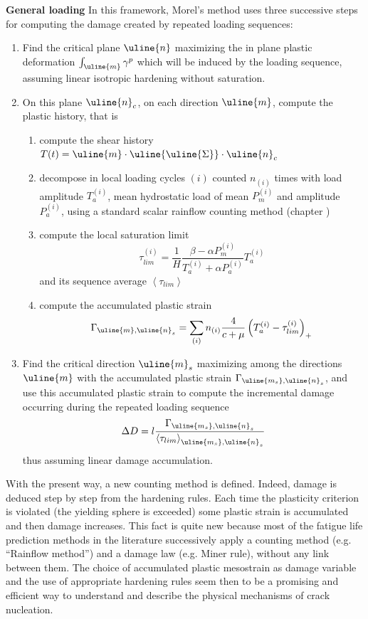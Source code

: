 \textbf{General loading}
 In this framework, Morel's method uses three successive steps for computing the damage created by repeated loading sequences:

\begin{enumerate}
\item Find the critical plane $\uline{n}$ maximizing the in plane plastic deformation $\int_{\uline{m}}\gamma^p$ which will be induced by the loading sequence, assuming linear isotropic hardening without saturation.
\item On this plane  $\uline{n}_c$, on each direction $\uline{m}$, compute the plastic history, that is
\begin{enumerate}
	\item compute the shear history $T(t)=\uline{m}\cdot \uline{\uline{\Sigma}}\cdot \uline{n}_c$
	\item decompose in local loading cycles $(i)$ counted $n_{(i)}$ times with load amplitude $T_a^{(i)}$, mean hydrostatic load of mean $P_m^{(i)}$ and amplitude $P_a^{(i)}$, using a standard scalar rainflow counting method (chapter \cite{chp:4})
	\item compute the local saturation limit $$\tau_{lim}^{(i)}=\frac{1}{H}\frac{\beta-\alpha P_m^{(i)}}{T_a^{(i)}+\alpha P_a^{(i)}}T_a^{(i)}$$ and its sequence average $\left\langle \tau_{lim} \right\rangle$ 
	\item compute the accumulated plastic strain 
	\begin{equation}
\Gamma_{\uline{m},\uline{n}_s}=\sum_{(i)}n_{(i)}\dfrac{4}{c+\mu}\left(T_a^{(i)}-\tau_{lim}^{(i)} \right)_+
\label{eq.morel_plastic}
	\end{equation}
\end{enumerate}
\item Find the critical direction $\uline{m}_s$ maximizing among the directions $\uline{m}$ with the accumulated plastic strain $\Gamma_{\uline{m_s},\uline{n}_s}$, and use this accumulated plastic strain to compute the incremental damage occurring during the repeated loading sequence
\begin{equation}\Delta D=l\dfrac{\Gamma_{\uline{m_s},\uline{n}_s}}{\left\langle \tau_{lim} \right\rangle_{\uline{m_s},\uline{n}_s}}
	\label{NFsimple}
\end{equation}
thus assuming linear damage accumulation.
\end{enumerate}

With the present way, a new counting method is defined. Indeed, damage is deduced step by step from
the hardening rules. Each time the plasticity criterion is
violated (the yielding sphere is exceeded) some plastic
strain is accumulated and then damage increases. This
fact is quite new because most of the fatigue life prediction methods in the literature successively apply a counting method (e.g. ``Rainflow method'') and a damage law
(e.g. Miner rule), without any link between them. The
choice of accumulated plastic mesostrain as damage
variable and the use of appropriate hardening rules seem
then to be a promising and efficient way to understand
and describe the physical mechanisms of crack
nucleation.

